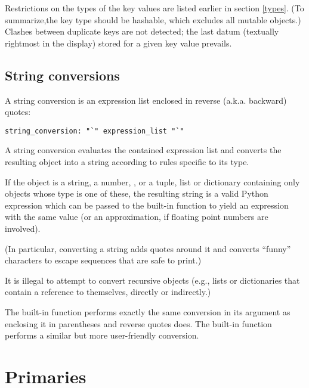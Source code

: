 Restrictions on the types of the key values are listed earlier in
section \ref{types}.  (To summarize,the key type should be hashable,
which excludes all mutable objects.)  Clashes between duplicate keys
are not detected; the last datum (textually rightmost in the display)
stored for a given key value prevails.

\subsection{String conversions\label{string-conversions}}

A string conversion is an expression list enclosed in reverse (a.k.a.
backward) quotes:

\begin{verbatim}
string_conversion: "`" expression_list "`"
\end{verbatim}

A string conversion evaluates the contained expression list and
converts the resulting object into a string according to rules
specific to its type.

If the object is a string, a number, , or a tuple, list or
dictionary containing only objects whose type is one of these, the
resulting string is a valid Python expression which can be passed to
the built-in function  to yield an expression with the
same value (or an approximation, if floating point numbers are
involved).

(In particular, converting a string adds quotes around it and converts
``funny'' characters to escape sequences that are safe to print.)

It is illegal to attempt to convert recursive objects (e.g., lists or
dictionaries that contain a reference to themselves, directly or
indirectly.)

The built-in function  performs exactly the same
conversion in its argument as enclosing it in parentheses and reverse
quotes does.  The built-in function  performs a
similar but more user-friendly conversion.

\section{Primaries\label{primaries}}

